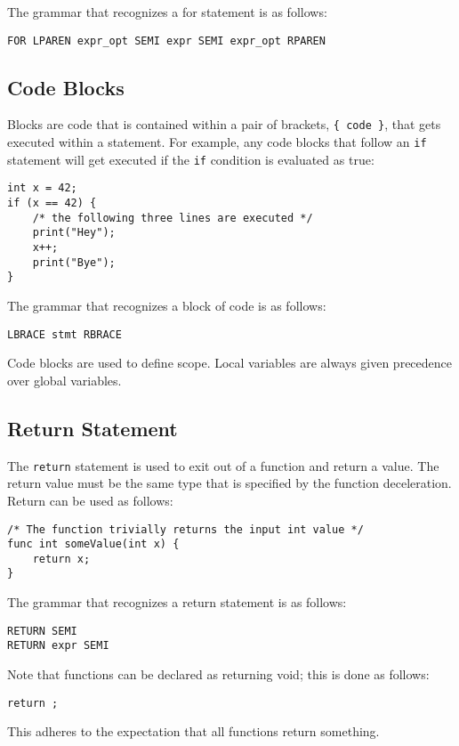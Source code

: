 \documentclass{article}
\begin{document}
The grammar that recognizes a for statement is as follows:
\begin{Verbatim}[frame=single]
FOR LPAREN expr_opt SEMI expr SEMI expr_opt RPAREN
\end{Verbatim}

\subsection{Code Blocks}
Blocks are code that is contained within a pair of brackets, \texttt{\{ code \}}, that gets executed within a statement.  For example, any code blocks that follow an \texttt{if} statement will get executed if the \texttt{if} condition is evaluated as true:

\begin{lstlisting}
int x = 42;
if (x == 42) {
	/* the following three lines are executed */
	print("Hey");
	x++;
	print("Bye");
}
\end{lstlisting}

The grammar that recognizes a block of code is as follows:
\begin{Verbatim}[frame=single]
LBRACE stmt RBRACE
\end{Verbatim}

Code blocks are used to define scope. Local variables are always given precedence over global variables. 

\subsection{Return Statement}
The \texttt{return} statement is used to exit out of a function and return a value.  The return value must be the same type that is specified by the function deceleration.  Return can be used as follows:

\begin{lstlisting}
/* The function trivially returns the input int value */
func int someValue(int x) {
	return x;
}
\end{lstlisting}

The grammar that recognizes a return statement is as follows:
\begin{Verbatim}[frame=single]
RETURN SEMI
RETURN expr SEMI
\end{Verbatim}

Note that functions can be declared as returning void; this is done as follows: 
\begin{lstlisting}
return ;
\end{lstlisting}
This adheres to the expectation that all functions return something.
\end{document}
